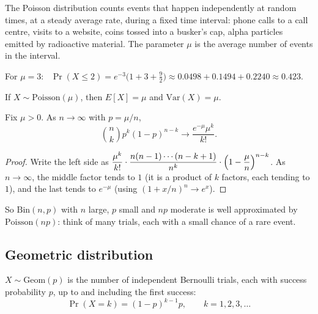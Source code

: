 \begin{note}
The Poisson distribution counts events that happen independently at random times, at a steady average rate, during a fixed time interval: phone calls to a call centre, visits to a website, coins tossed into a busker's cap, alpha particles emitted by radioactive material. The parameter $\mu$ is the average number of events in the interval.
\end{note}

\begin{example}
For $\mu=3$: \ $\Pr(X\le2)=e^{-3}\bigl(1+3+\tfrac92\bigr)\approx0.0498+0.1494+0.2240\approx0.423$.
\end{example}

\begin{proposition}
If $X\sim\mathrm{Poisson}(\mu)$, then $E[X]=\mu$ and $\mathrm{Var}(X)=\mu$.
\end{proposition}

\begin{theorem}
Fix $\mu>0$. As $n\to\infty$ with $p=\mu/n$,
\[
\binom{n}{k}p^k(1-p)^{n-k} \to \frac{e^{-\mu}\mu^k}{k!}.
\]
\end{theorem}
\begin{proof}
Write the left side as $\dfrac{\mu^k}{k!}\cdot\dfrac{n(n-1)\cdots(n-k+1)}{n^k}\cdot\Bigl(1-\dfrac\mu n\Bigr)^{n-k}$. As $n\to\infty$, the middle factor tends to $1$ (it is a product of $k$ factors, each tending to $1$), and the last tends to $e^{-\mu}$ (using $(1+x/n)^n\to e^x$).
\end{proof}

\begin{note}
So $\mathrm{Bin}(n,p)$ with $n$ large, $p$ small and $np$ moderate is well approximated by $\mathrm{Poisson}(np)$: think of many trials, each with a small chance of a rare event.
\end{note}

\subsection{Geometric distribution}
\label{sec:10-10}

\begin{definition}
$X\sim\mathrm{Geom}(p)$ is the number of independent Bernoulli trials, each with success probability $p$, up to and including the first success:
\[
\Pr(X=k) = (1-p)^{k-1}p, \qquad k=1,2,3,\dots
\]
\end{definition}

